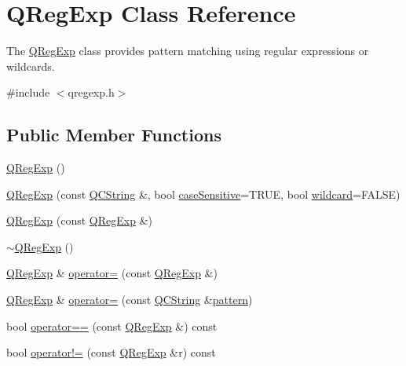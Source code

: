 \hypertarget{class_q_reg_exp}{}\section{Q\+Reg\+Exp Class Reference}
\label{class_q_reg_exp}


The \mbox{\hyperlink{class_q_reg_exp}{Q\+Reg\+Exp}} class provides pattern matching using regular expressions or wildcards.  




{\ttfamily \#include $<$qregexp.\+h$>$}

\subsection*{Public Member Functions}
\begin{DoxyCompactItemize}
\item 
\mbox{\hyperlink{class_q_reg_exp_a65d0a33606138cfe702c629566415518}{Q\+Reg\+Exp}} ()
\item 
\mbox{\hyperlink{class_q_reg_exp_a2706f7fb6279510e07e9285040c8758e}{Q\+Reg\+Exp}} (const \mbox{\hyperlink{class_q_c_string}{Q\+C\+String}} \&, bool \mbox{\hyperlink{class_q_reg_exp_ae1e5a7363426ebf095c2312ad5472a35}{case\+Sensitive}}=T\+R\+UE, bool \mbox{\hyperlink{class_q_reg_exp_ab56c5356c514e92127cfea318fe47ba9}{wildcard}}=F\+A\+L\+SE)
\item 
\mbox{\hyperlink{class_q_reg_exp_ac60dcc085567049d803a6aa51df69cc2}{Q\+Reg\+Exp}} (const \mbox{\hyperlink{class_q_reg_exp}{Q\+Reg\+Exp}} \&)
\item 
\mbox{\hyperlink{class_q_reg_exp_a560f33f2c289de7d88b393c00dda4d22}{$\sim$\+Q\+Reg\+Exp}} ()
\item 
\mbox{\hyperlink{class_q_reg_exp}{Q\+Reg\+Exp}} \& \mbox{\hyperlink{class_q_reg_exp_ad226f89bfe9bda3b00ddbbcaf1179cc7}{operator=}} (const \mbox{\hyperlink{class_q_reg_exp}{Q\+Reg\+Exp}} \&)
\item 
\mbox{\hyperlink{class_q_reg_exp}{Q\+Reg\+Exp}} \& \mbox{\hyperlink{class_q_reg_exp_a71ff6aeb87b7ec3d8b97c18dbf68947f}{operator=}} (const \mbox{\hyperlink{class_q_c_string}{Q\+C\+String}} \&\mbox{\hyperlink{class_q_reg_exp_ad2b7d2452926d97a5203ea1c1247a357}{pattern}})
\item 
bool \mbox{\hyperlink{class_q_reg_exp_ae7fc98d62140dd758da197b2d7ffe8ff}{operator==}} (const \mbox{\hyperlink{class_q_reg_exp}{Q\+Reg\+Exp}} \&) const
\item 
bool \mbox{\hyperlink{class_q_reg_exp_a410aac6baaca7650e6273e2ecf4933fa}{operator!=}} (const \mbox{\hyperlink{class_q_reg_exp}{Q\+Reg\+Exp}} \&r) const

\end{DoxyCompactItemize}
